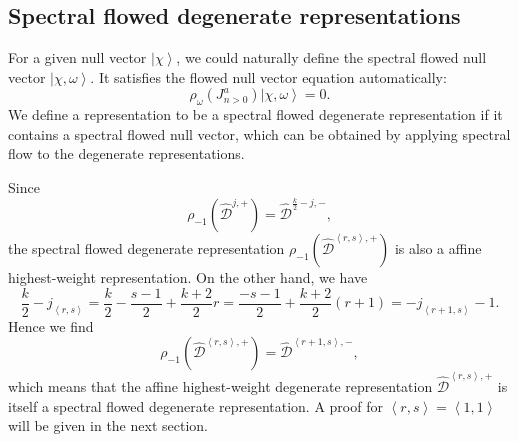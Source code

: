 \documentclass[10pt,a4paper]{article}
\numberwithin{equation}{section}
\newcommand{\ket}[1]{\left| #1 \right\rangle}
\newcommand{\vev}[1]{\left\langle #1 \right\rangle}
\begin{document}
\subsection{Spectral flowed degenerate representations}

For a given null vector $\ket{\chi}$, we could naturally define the spectral flowed null vector $\ket{\chi,\omega}$. 
It satisfies the flowed null vector equation automatically:
\begin{equation}
    \rho_{\omega} \left(J^{a}_{n>0}\right) \ket{\chi,\omega} = 0.
\end{equation}
We define a representation to be a spectral flowed degenerate representation if it contains a spectral flowed null vector, which can 
be obtained by applying spectral flow to the degenerate representations.

Since 
\begin{equation}
    \rho_{-1} \left( \widehat{\mathcal{D}}^{j,+} \right) = \widehat{\mathcal{D}}^{\frac{k}{2}-j,-},
\end{equation}
the spectral flowed degenerate representation $\rho_{-1} \left( \widehat{\mathcal{D}}^{\vev{r,s},+} \right)$ is also a affine highest-weight 
representation. On the other hand, we have 
\begin{equation}
    \frac{k}{2} - j_{\vev{r,s}} = \frac{k}{2} - \frac{s-1}{2} + \frac{k+2}{2} r = \frac{-s-1}{2} + \frac{k+2}{2}(r+1) = -j_{\vev{r+1,s}}-1.
\end{equation}
Hence we find
\begin{equation}
    \rho_{-1} \left( \widehat{\mathcal{D}}^{\vev{r,s},+} \right) = \widehat{\mathcal{D}}^{\vev{r+1,s},-},
\end{equation}
which means that the affine highest-weight degenerate representation $\widehat{\mathcal{D}}^{\vev{r,s},+}$ is itself a spectral flowed 
degenerate representation. A proof for $\vev{r,s} = \vev{1,1}$ will be given in the next section.
\end{document}
